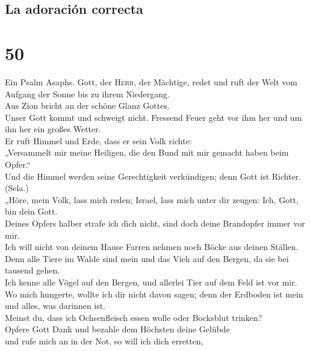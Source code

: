 \hypertarget{la-adoraciuxf3n-correcta}{%
\subsection{La adoración correcta}\label{la-adoraciuxf3n-correcta}}

\hypertarget{section-49}{%
\section{50}\label{section-49}}

 Ein Psalm Asaphs. Gott, der \textsc{Herr}, der Mächtige,
redet und ruft der Welt vom Aufgang der Sonne bis zu ihrem Niedergang.\\
 Aus Zion bricht an der schöne Glanz Gottes.\\
 Unser Gott kommt und schweigt nicht. Fressend Feuer geht
vor ihm her und um ihn her ein großes Wetter.\\
 Er ruft Himmel und Erde, dass er sein Volk richte:\\
 „Versammelt mir meine Heiligen, die den Bund mit mir
gemacht haben beim Opfer.``\\
 Und die Himmel werden seine Gerechtigkeit verkündigen;
denn Gott ist Richter. (Sela.)\\
 „Höre, mein Volk, lass mich reden; Israel, lass mich
unter dir zeugen: Ich, Gott, bin dein Gott.\\
 Deines Opfers halber strafe ich dich nicht, sind doch
deine Brandopfer immer vor mir.\\
 Ich will nicht von deinem Hause Farren nehmen noch Böcke
aus deinen Ställen.\\
 Denn alle Tiere im Walde sind mein und das Vieh auf den
Bergen, da sie bei tausend gehen.\\
 Ich kenne alle Vögel auf den Bergen, und allerlei Tier
auf dem Feld ist vor mir.\\
 Wo mich hungerte, wollte ich dir nicht davon sagen; denn
der Erdboden ist mein und alles, was darinnen ist.\\
 Meinst du, dass ich Ochsenfleisch essen wolle oder
Bocksblut trinken?\\
 Opfere Gott Dank und bezahle dem Höchsten deine
Gelübde\\
 und rufe mich an in der Not, so will ich dich erretten,

